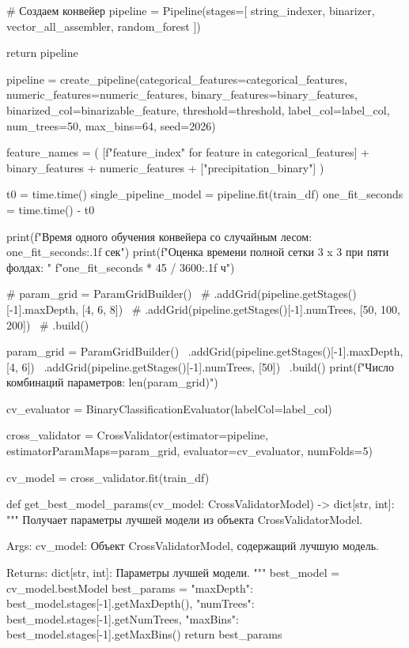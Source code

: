 \begin{code}
    # Создаем конвейер
    pipeline = Pipeline(stages=[
        string_indexer, binarizer, vector_all_assembler, random_forest
    ])

    return pipeline

pipeline = create_pipeline(categorical_features=categorical_features,
                           numeric_features=numeric_features,
                           binary_features=binary_features,
                           binarized_col=binarizable_feature,
                           threshold=threshold,
                           label_col=label_col,
                           num_trees=50,
                           max_bins=64,
                           seed=2026)

feature_names = (
    [f"{feature}_index" for feature in categorical_features]
    + binary_features
    + numeric_features
    + ["precipitation_binary"]
)

t0 = time.time()
single_pipeline_model = pipeline.fit(train_df)
one_fit_seconds = time.time() - t0

print(f"Время одного обучения конвейера со случайным лесом: {one_fit_seconds:.1f} сек")
print(f"Оценка времени полной сетки 3 x 3 при пяти фолдах: "
      f"{one_fit_seconds * 45 / 3600:.1f} ч")

# param_grid = ParamGridBuilder() \
#     .addGrid(pipeline.getStages()[-1].maxDepth, [4, 6, 8]) \
#     .addGrid(pipeline.getStages()[-1].numTrees, [50, 100, 200]) \
#     .build()

param_grid = ParamGridBuilder() \
    .addGrid(pipeline.getStages()[-1].maxDepth, [4, 6]) \
    .addGrid(pipeline.getStages()[-1].numTrees, [50]) \
    .build()
print(f"Число комбинаций параметров: {len(param_grid)}")

cv_evaluator = BinaryClassificationEvaluator(labelCol=label_col)

cross_validator = CrossValidator(estimator=pipeline,
                                 estimatorParamMaps=param_grid,
                                 evaluator=cv_evaluator,
                                 numFolds=5)

cv_model = cross_validator.fit(train_df)

def get_best_model_params(cv_model: CrossValidatorModel) -> dict[str, int]:
    """
    Получает параметры лучшей модели из объекта CrossValidatorModel.

    Args:
        cv_model: Объект CrossValidatorModel, содержащий лучшую модель.

    Returns:
        dict[str, int]: Параметры лучшей модели.
    """
    best_model = cv_model.bestModel
    best_params = {
        "maxDepth": best_model.stages[-1].getMaxDepth(),
        "numTrees": best_model.stages[-1].getNumTrees,
        "maxBins": best_model.stages[-1].getMaxBins()
    }
    return best_params


\end{code}
